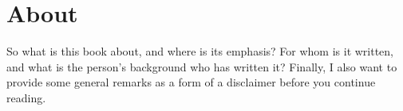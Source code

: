 \chapter{About}\label{ch:about}


So what is this book about, and where is its emphasis?
For whom is it written, and what is the person's background who has written it?
Finally, I also want to provide some general remarks as a form of a disclaimer before you continue reading.






